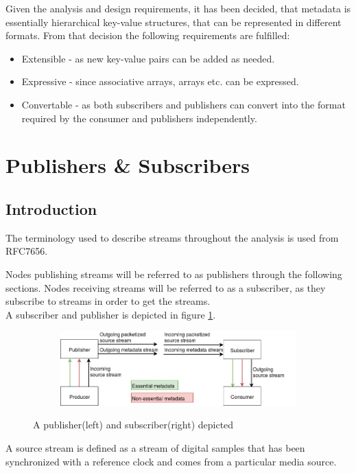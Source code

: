 Given the analysis and design requirements, it has been decided, that metadata is essentially hierarchical key-value structures, that can be represented in different formats. From that decision the following requirements are fulfilled:
\begin{itemize}
	\item Extensible - as new key-value pairs can be added as needed.
	\item Expressive - since associative arrays, arrays etc. can be expressed.
	\item Convertable - as both subscribers and publishers can convert into the format required by the consumer and publishers independently.
\end{itemize}

\section{Publishers \& Subscribers}
\subsection{Introduction}
The terminology used to describe streams throughout the analysis is used from RFC7656.

Nodes publishing streams will be referred to as publishers through the following sections. Nodes receiving streams will be referred to as a subscriber, as they subscribe to streams in order to get the streams. \\
A subscriber and publisher is depicted in figure \ref{fig:analysis:pubsub}.

\begin{figure}[h!]
    \centering
    \begin{subfigure}[b]{1\textwidth}
        \includegraphics[width=\textwidth]{figures/publisher-subscriber}
    \end{subfigure}
     \caption{A publisher(left) and subscriber(right) depicted}\label{fig:analysis:pubsub}
\end{figure}

A source stream is defined as a stream of digital samples that has been synchronized with a reference clock and comes from a particular media source.

